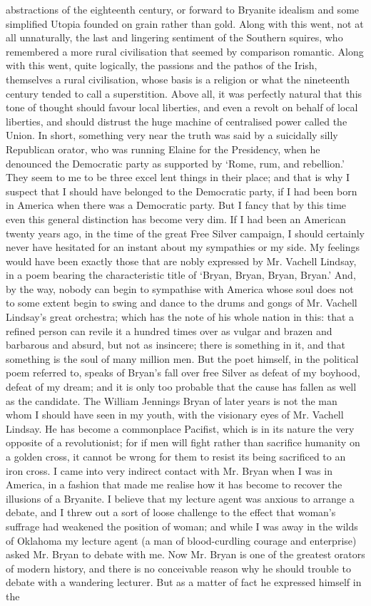 \documentclass{book}
\begin{document}
abstractions of the eighteenth century, or forward to Bryanite idealism and some simplified Utopia founded on grain rather than gold. Along with this went, not at all unnaturally, the last and lingering sentiment of the Southern squires, who remembered a more rural civilisation that seemed by comparison romantic. Along with this went, quite logically, the passions and the pathos of the Irish, themselves a rural civilisation, whose basis is a religion or what the nineteenth century tended to call a superstition. Above all, it was perfectly natural that this tone of thought should favour local liberties, and even a revolt on behalf of local liberties, and should distrust the huge machine of centralised power called the Union. In short, something very near the truth was said by a suicidally silly Republican orator, who was running Elaine for the Presidency, when he denounced the Democratic party as supported by ‘Rome, rum, and rebellion.’ They seem to me to be three excel lent things in their place; and that is why I suspect that I should have belonged to the Democratic party, if I had been born in America when there was a Democratic party. But I fancy that by this time even this general distinction has become very dim. If I had been an American twenty years ago, in the time of the great Free Silver campaign, I should certainly never have hesitated for an instant about my sympathies or my side. My feelings would have been exactly those that are nobly expressed by Mr. Vachell Lindsay, in a poem bearing the characteristic title of ‘Bryan, Bryan, Bryan, Bryan.’ And, by the way, nobody can begin to sympathise with America whose soul does not to some extent begin to swing and dance to the drums and gongs of Mr. Vachell Lindsay’s great orchestra; which has the note of his whole nation in this: that a refined person can revile it a hundred times over as vulgar and brazen and barbarous and absurd, but not as insincere; there is something in it, and that something is the soul of many million men. But the poet himself, in the political poem referred to, speaks of Bryan’s fall over free Silver as defeat of my boyhood, defeat of my dream; and it is only too probable that the cause has fallen as well as the candidate. The William Jennings Bryan of later years is not the man whom I should have seen in my youth, with the visionary eyes of Mr. Vachell Lindsay. He has become a commonplace Pacifist, which is in its nature the very opposite of a revolutionist; for if men will fight rather than sacrifice humanity on a golden cross, it cannot be wrong for them to resist its being sacrificed to an iron cross. I came into very indirect contact with Mr. Bryan when I was in America, in a fashion that made me realise how it has become to recover the illusions of a Bryanite. I believe that my lecture agent was anxious to arrange a debate, and I threw out a sort of loose challenge to the effect that woman’s suffrage had weakened the position of woman; and while I was away in the wilds of Oklahoma my lecture agent (a man of blood-curdling courage and enterprise) asked Mr. Bryan to debate with me. Now Mr. Bryan is one of the greatest orators of modern history, and there is no conceivable reason why he should trouble to debate with a wandering lecturer. But as a matter of fact he expressed himself in the 
\end{document}
